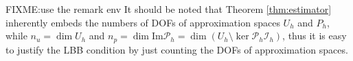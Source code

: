 FIXME:use the remark env
It should be noted that Theorem \ref{thm:estimator} inherently embeds the numbers of DOFs of approximation spaces $U_h$ and $P_h$,
while $n_u = \dim U_h$ and $n_p =\dim \mathrm{Im} \mathcal P_h = \dim (U_h \setminus \ker \mathcal P_h \mathcal I_h)$,
thus it is easy to justify the LBB condition by just counting the DOFs of approximation spaces.